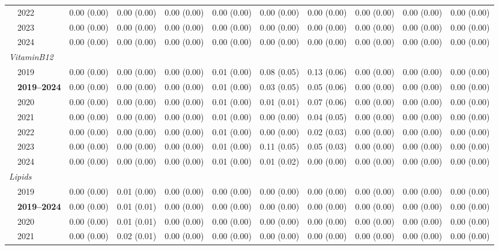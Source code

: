 \begin{table}[htbp]
\begin{tabular}{llrrrrrrrrr}
 & 2022 & 0.00 (0.00) & 0.00 (0.00) & 0.00 (0.00) & 0.00 (0.00) & 0.00 (0.00) & 0.00 (0.00) & 0.00 (0.00) & 0.00 (0.00) & 0.00 (0.00) \\
 & 2023 & 0.00 (0.00) & 0.00 (0.00) & 0.00 (0.00) & 0.00 (0.00) & 0.00 (0.00) & 0.00 (0.00) & 0.00 (0.00) & 0.00 (0.00) & 0.00 (0.00) \\
 & 2024 & 0.00 (0.00) & 0.00 (0.00) & 0.00 (0.00) & 0.00 (0.00) & 0.00 (0.00) & 0.00 (0.00) & 0.00 (0.00) & 0.00 (0.00) & 0.00 (0.00) \\
\midrule
\multicolumn{11}{l}{\textit{VitaminB12}} \\
 & 2019 & 0.00 (0.00) & 0.00 (0.00) & 0.00 (0.00) & 0.01 (0.00) & 0.08 (0.05) & 0.13 (0.06) & 0.00 (0.00) & 0.00 (0.00) & 0.00 (0.00) \\
 & \textbf{2019–2024} & 0.00 (0.00) & 0.00 (0.00) & 0.00 (0.00) & 0.01 (0.00) & 0.03 (0.05) & 0.05 (0.06) & 0.00 (0.00) & 0.00 (0.00) & 0.00 (0.00) \\
 & 2020 & 0.00 (0.00) & 0.00 (0.00) & 0.00 (0.00) & 0.01 (0.00) & 0.01 (0.01) & 0.07 (0.06) & 0.00 (0.00) & 0.00 (0.00) & 0.00 (0.00) \\
 & 2021 & 0.00 (0.00) & 0.00 (0.00) & 0.00 (0.00) & 0.01 (0.00) & 0.00 (0.00) & 0.04 (0.05) & 0.00 (0.00) & 0.00 (0.00) & 0.00 (0.00) \\
 & 2022 & 0.00 (0.00) & 0.00 (0.00) & 0.00 (0.00) & 0.01 (0.00) & 0.00 (0.00) & 0.02 (0.03) & 0.00 (0.00) & 0.00 (0.00) & 0.00 (0.00) \\
 & 2023 & 0.00 (0.00) & 0.00 (0.00) & 0.00 (0.00) & 0.01 (0.00) & 0.11 (0.05) & 0.05 (0.03) & 0.00 (0.00) & 0.00 (0.00) & 0.00 (0.00) \\
 & 2024 & 0.00 (0.00) & 0.00 (0.00) & 0.00 (0.00) & 0.01 (0.00) & 0.01 (0.02) & 0.00 (0.00) & 0.00 (0.00) & 0.00 (0.00) & 0.00 (0.00) \\
\midrule
\multicolumn{11}{l}{\textit{Lipids}} \\
 & 2019 & 0.00 (0.00) & 0.01 (0.00) & 0.00 (0.00) & 0.00 (0.00) & 0.00 (0.00) & 0.00 (0.00) & 0.00 (0.00) & 0.00 (0.00) & 0.00 (0.00) \\
 & \textbf{2019–2024} & 0.00 (0.00) & 0.01 (0.01) & 0.00 (0.00) & 0.00 (0.00) & 0.00 (0.00) & 0.00 (0.00) & 0.00 (0.00) & 0.00 (0.00) & 0.00 (0.00) \\
 & 2020 & 0.00 (0.00) & 0.01 (0.01) & 0.00 (0.00) & 0.00 (0.00) & 0.00 (0.00) & 0.00 (0.00) & 0.00 (0.00) & 0.00 (0.00) & 0.00 (0.00) \\
 & 2021 & 0.00 (0.00) & 0.02 (0.01) & 0.00 (0.00) & 0.00 (0.00) & 0.00 (0.00) & 0.00 (0.00) & 0.00 (0.00) & 0.00 (0.00) & 0.00 (0.00) \\

\end{tabular}
\end{table}
